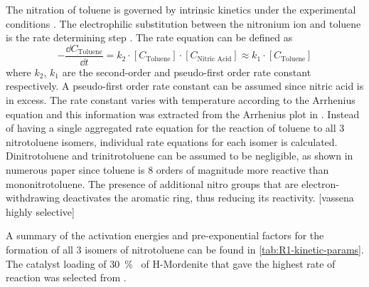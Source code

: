 
The nitration of toluene is governed by intrinsic kinetics under the experimental conditions \cite{jeeru_kinetics_2018}. The electrophilic substitution between the  nitronium ion and toluene is the rate determining step \cite{carey_advanced_2007}. The rate equation can be defined as  
\begin{equation}
-\frac{\dd C_\mathrm{Toluene}}{\dd t} = k_{2} \cdot [C_\mathrm{Toluene}] \cdot [C_\text{Nitric Acid}] \approx k_{1} \cdot [C_\mathrm{Toluene}]
\end{equation}
where $k_2$, $k_1$ are the second-order and pseudo-first order rate constant respectively. A pseudo-first order rate constant can be assumed since nitric acid is in excess. The rate constant varies with temperature according to the Arrhenius equation and this information was extracted from the Arrhenius plot in \textcite{jeeru_kinetics_2018}. Instead of having a single aggregated rate equation for the reaction of toluene to all 3 nitrotoluene isomers, individual rate equations for each isomer is calculated. Dinitrotoluene and trinitrotoluene can be assumed to be negligible, as shown in numerous paper since toluene is 8 orders of magnitude more reactive than mononitrotoluene. The presence of additional nitro groups that are electron-withdrawing deactivates the aromatic ring, thus reducing its reactivity.
[vassena highly selective]

A summary of the activation energies and pre-exponential factors for the formation of all 3 isomers of nitrotoluene can be found in \cref{tab:R1-kinetic-params}. The catalyst loading of \SI{30}{\percent\wv} of H-Mordenite that gave the highest rate of reaction was selected from \textcite{jeeru_kinetics_2018}.

